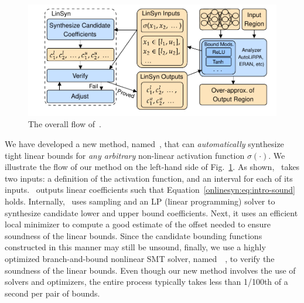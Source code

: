 \begin{figure}[t]
	\centering
	\includegraphics[width=.9\linewidth]{onlinesyn/figs/flow_diagram.pdf}
\caption{The overall flow of~\Name{}.\label{onlinesyn:fig:block-diagram}}
\end{figure}


We have developed a new method, named~\Name{}, that can \emph{automatically}
synthesize tight linear bounds for \emph{any arbitrary} non-linear activation
function $ \sigma(\cdot) $.
%
We illustrate the flow of our method on the left-hand side of
Fig.~\ref{onlinesyn:fig:block-diagram}. As shown,~\Name{} takes two inputs: a
definition of the activation function, and an interval for each of its
inputs.~\Name{} outputs linear coefficients such that
Equation~\ref{onlinesyn:eq:intro-sound} holds.
%
Internally,~\Name{}
uses sampling and an LP (linear programming) solver to synthesize
candidate lower and upper bound coefficients.
Next, it uses an
efficient local minimizer to compute a good estimate of the offset
needed to ensure soundness of the linear bounds.
%
Since the candidate bounding functions constructed in this manner may
still be unsound, finally, we use a highly optimized branch-and-bound
nonlinear SMT solver, named~\dReal{}~\cite{gao2013dreal}, to verify the
soundness of the linear bounds.
%
Even though our new method involves the use of solvers and
optimizers, the entire process typically takes less than 1/100th of a
second per pair of bounds.

